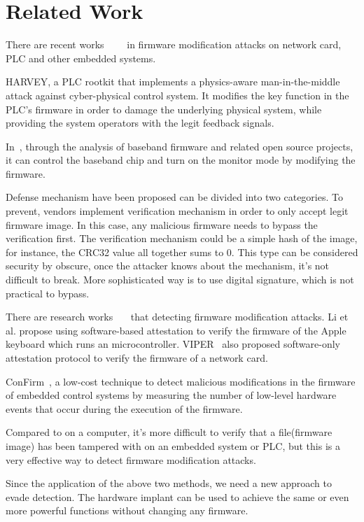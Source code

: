 \section{Related Work}
\label{sec:relatedwork}

There are recent works~\cite{garcia2017hey}~\cite{basnight2013firmware}~\cite{blanco2012one}~\cite{cui2013firmware} in firmware modification attacks on network card, PLC and other embedded systems.

HARVEY, a PLC rootkit that implements a physics-aware man-in-the-middle attack against cyber-physical control system. It modifies the key function in the PLC's firmware in order to damage the underlying physical system, while providing the system operators with the legit feedback signals.

In~\cite{blanco2012one}, through the analysis of baseband firmware and related open source projects, it can control the baseband chip and turn on the monitor mode by modifying the firmware.

Defense mechanism have been proposed can be divided into two categories. To prevent, vendors implement verification mechanism in order to only accept legit firmware image. In this case, any malicious firmware needs to bypass the verification first. The verification mechanism could be a simple hash of the image, for instance, the CRC32 value all together sums to 0. This type can be considered security by obscure, once the attacker knows about the mechanism, it's not difficult to break. More sophisticated way is to use digital signature, which is not practical to bypass. 

There are research works~\cite{li2011viper}~\cite{wang2015confirm}~\cite{li2011viper} that detecting firmware modification attacks. Li et al. propose using software-based attestation to verify the firmware of the Apple keyboard which runs an microcontroller. VIPER~\cite{li2011viper} also proposed software-only attestation protocol to verify the firmware of a network card.

ConFirm~\cite{wang2015confirm}, a low-cost technique to detect malicious modifications in the firmware of embedded control systems by measuring the number of low-level hardware events that occur during the execution of the firmware.

Compared to on a computer, it's more difficult to verify that a file(firmware image) has been tampered with on an embedded system or PLC, but this is a very effective way to detect firmware modification attacks.


Since the application of the above two methods, we need a new approach to evade detection. The hardware implant can be used to achieve the same or even more powerful functions without changing any firmware.
